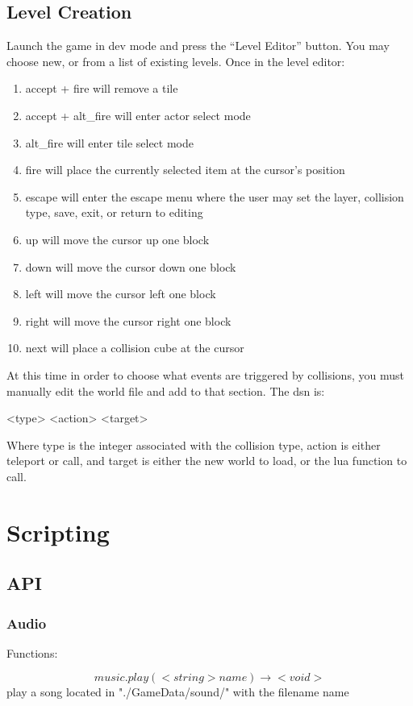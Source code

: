 \documentclass[11pt,fleqn]{book} %
\begin{document}
\section{Level Creation}
Launch the game in dev mode and press the ``Level Editor'' button. You may choose new, or from a list of existing levels. Once in the level editor:
\begin{enumerate}
 \item accept + fire will remove a tile
 \item accept + alt\_fire will enter actor select mode
 \item alt\_fire will enter tile select mode
 \item fire will place the currently selected item at the cursor's position
 \item escape will enter the escape menu where the user may set the layer, collision type, save, exit, or return to editing
 \item up will move the cursor up one block
 \item down will move the cursor down one block
 \item left will move the cursor left one block
 \item right will move the cursor right one block
 \item next will place a collision cube at the cursor
\end{enumerate}
At this time in order to choose what events are triggered by collisions, you must manually edit the world file and add to that section. The dsn is:
\begin{theorem}
 <type> <action> <target>
\end{theorem}
Where type is the integer associated with the collision type, action is either teleport or call, and target is either the new world to load, or the lua function to call.


\chapter{Scripting}
\section{API}
\subsection{Audio}
Functions:

\begin{equation}
music.play(<string> name) \rightarrow <void>
\end{equation}
play a song located in "./GameData/sound/" with the filename name
\end{document}
